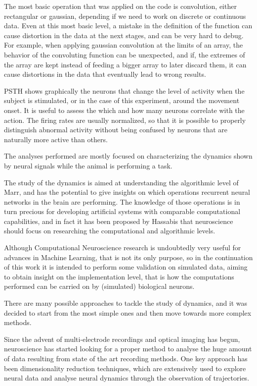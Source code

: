 The most basic operation that was applied on the code is convolution, either rectangular or gaussian, depending if we need to work on discrete or continuous data. Even at this most basic level, a mistake in the definition of the function can cause distortion in the data at the next stages, and can be very hard to debug. For example, when applying gaussian convolution at the limits of an array, the behavior of the convoluting function can be unexpected, and if, the extremes of the array are kept instead of feeding a bigger array to later discard them, it can cause distortions in the data that eventually lead to wrong results.

PSTH shows graphically the neurons that change the level of activity when the subject is stimulated, or in the case of this experiment, around the movement onset. It is useful to assess the which and how many neurons correlate with the action. The firing rates are usually normalized, so that it is possible to properly distinguish abnormal activity without being confused by neurons that are naturally more active than others.


The analyses performed are mostly focused on characterizing the dynamics shown by neural signals while the animal is performing a task. 

The study of the dynamics is aimed at understanding the algorithmic level of Marr, and has the potential to give insights on which operations recurrent neural networks in the brain are performing. The knowledge of those operations is in turn precious for developing artificial systems with comparable computational capabilities, and in fact it has been proposed by Hassabis \cite{hassabis2017neuroscience} that neuroscience should focus on researching the computational and algorithmic levels. 

Although Computational Neuroscience research is undoubtedly very useful for advances in Machine Learning, that is not its only purpose, so in the continuation of this work it is intended to perform some validation on simulated data, aiming to obtain insight on the implementation level, that is how the computations performed can be carried on by (simulated) biological neurons.

There are many possible approaches to tackle the study of dynamics, and it was decided to start from the most simple ones and then move towards more complex methods.

Since the advent of multi-electrode recordings and optical imaging has begun, neuroscience has started looking for a proper method to analyse the huge amount of data resulting from state of the art recording methods.
One key approach has been dimensionality reduction techniques, which are extensively used to explore neural data and analyse neural dynamics through the observation of trajectories.

